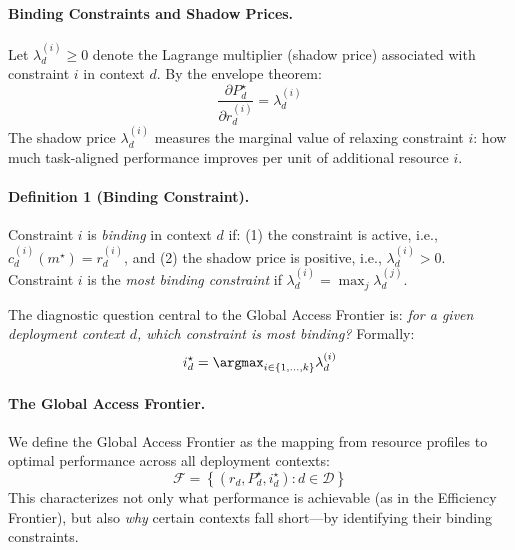 \paragraph{Binding Constraints and Shadow Prices.} Let $\lambda_d^{(i)} \geq 0$ denote the Lagrange multiplier (shadow price) associated with constraint $i$ in context $d$. By the envelope theorem:
\begin{equation}
    \frac{\partial P_d^\star}{\partial r_d^{(i)}} = \lambda_d^{(i)}
    \label{eq:shadow-price}
\end{equation}
The shadow price $\lambda_d^{(i)}$ measures the marginal value of relaxing constraint $i$: how much task-aligned performance improves per unit of additional resource $i$.

\paragraph{Definition 1 (Binding Constraint).} Constraint $i$ is \emph{binding} in context $d$ if: (1) the constraint is active, i.e., $c_d^{(i)}(m^\star) = r_d^{(i)}$, and (2) the shadow price is positive, i.e., $\lambda_d^{(i)} > 0$. Constraint $i$ is the \emph{most binding constraint} if $\lambda_d^{(i)} = \max_{j} \lambda_d^{(j)}$.

The diagnostic question central to the Global Access Frontier is: \emph{for a given deployment context $d$, which constraint is most binding?} Formally:
\begin{equation}
    i^\star_d = \argmax_{i \in \{1, \ldots, k\}} \lambda_d^{(i)}
    \label{eq:diagnostic}
\end{equation}

\paragraph{The Global Access Frontier.} We define the Global Access Frontier as the mapping from resource profiles to optimal performance across all deployment contexts:
\begin{equation}
    \mathcal{F} = \left\{ \left( r_d, P_d^\star, i_d^\star \right) : d \in \mathcal{D} \right\}
    \label{eq:frontier}
\end{equation}
This characterizes not only what performance is achievable (as in the Efficiency Frontier), but also \emph{why} certain contexts fall short---by identifying their binding constraints.

